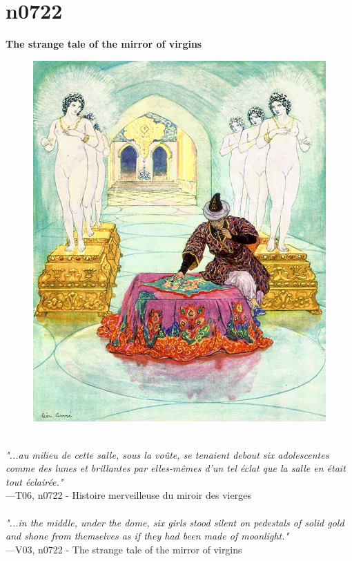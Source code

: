 \documentclass[../Carre_nights.tex]{subfiles}
\begin{document}
\newpage

\section{n0722}
\textbf{\Large{The strange tale of the mirror of virgins}} \\

\begin{figure}[ht]
\centering
\includegraphics[height=\figsize]{illustrations/volume_6/T06, n0722 - Histoire merveilleuse du miroir des vierges.jpg}
\end{figure}

\textit{\\
"...au milieu de cette salle, sous la voûte, se tenaient debout six adolescentes comme des lunes et brillantes par elles-mêmes d’un tel éclat que la salle en était tout éclairée."} \\
—T06, n0722 - Histoire merveilleuse du miroir des vierges \\~\\
\textit{"...in the middle, under the dome, six girls stood silent on pedestals of solid gold and shone from themselves as if they had been made of moonlight."} \\
—V03, n0722 - The strange tale of the mirror of virgins
\end{document}
